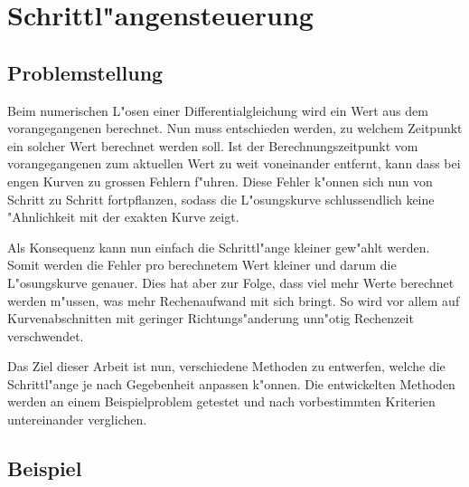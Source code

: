 \chapter{Schrittl"angensteuerung\label{chapter:schrittlaenge}}
\begin{refsection}


\section{Problemstellung}


Beim numerischen L"osen einer Differentialgleichung wird ein Wert aus dem vorangegangenen berechnet.
Nun muss entschieden werden, zu welchem Zeitpunkt ein solcher Wert berechnet werden soll.
Ist der Berechnungszeitpunkt vom vorangegangenen zum aktuellen Wert zu weit voneinander entfernt, kann dass bei engen Kurven zu grossen Fehlern f"uhren.
Diese Fehler k"onnen sich nun von Schritt zu Schritt fortpflanzen, sodass die L"osungskurve schlussendlich keine "Ahnlichkeit mit der exakten Kurve zeigt.

Als Konsequenz kann nun einfach die Schrittl"ange kleiner gew"ahlt werden.
Somit werden die Fehler pro berechnetem Wert kleiner und darum die L"osungskurve genauer.
Dies hat aber zur Folge, dass viel mehr Werte berechnet werden m"ussen, was mehr Rechenaufwand mit sich bringt.
So wird vor allem auf Kurvenabschnitten mit geringer Richtungs"anderung unn"otig Rechenzeit verschwendet.

Das Ziel dieser Arbeit ist nun, verschiedene Methoden zu entwerfen, welche die Schrittl"ange je nach Gegebenheit anpassen k"onnen. 
Die entwickelten Methoden werden an einem Beispielproblem getestet und nach vorbestimmten Kriterien untereinander verglichen.


\section{Beispiel}


\end{refsection}
